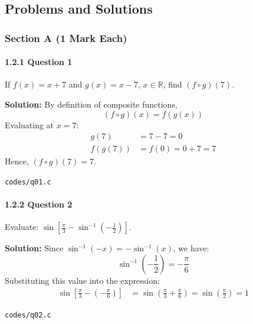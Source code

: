\documentclass{article}
\begin{document}
\newpage
\subsection{Problems and Solutions}

\subsubsection*{Section A (1 Mark Each)}

\paragraph{1.2.1 Question 1}
If $f(x) = x + 7$ and $g(x) = x - 7$, $x \in \mathbb{R}$, find $(f \circ g)(7)$.

\textbf{Solution:} By definition of composite functions,
\begin{equation}
(f \circ g)(x) = f(g(x))
\end{equation}
Evaluating at $x = 7$:
\begin{align}
g(7) &= 7 - 7 = 0 \\
f(g(7)) &= f(0) = 0 + 7 = 7
\end{align}
Hence, $(f \circ g)(7) = 7$.
\begin{tcolorbox}[colback=gray!10,colframe=black,width=\linewidth]
\texttt{codes/q01.c}
\end{tcolorbox}

\paragraph{1.2.2 Question 2}
Evaluate: $\sin\left[\frac{\pi}{3} - \sin^{-1}\left(-\frac{1}{2}\right)\right]$.

\textbf{Solution:} Since $\sin^{-1}(-x) = -\sin^{-1}(x)$, we have:
\begin{equation}
\sin^{-1}\left(-\frac{1}{2}\right) = -\frac{\pi}{6}
\end{equation}
Substituting this value into the expression:
\begin{align}
\sin\left[\frac{\pi}{3} - \left(-\frac{\pi}{6}\right)\right] &= \sin\left(\frac{\pi}{3} + \frac{\pi}{6}\right) = \sin\left(\frac{\pi}{2}\right) = 1
\end{align}
\begin{tcolorbox}[colback=gray!10,colframe=black,width=\linewidth]
\texttt{codes/q02.c}
\end{tcolorbox}
\end{document}
